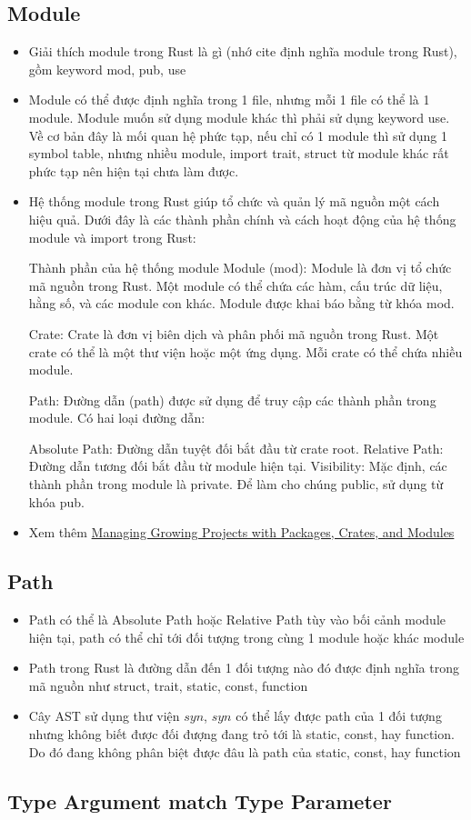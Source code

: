 \subsection{Module}

\begin{itemize}
    \item Giải thích module trong Rust là gì (nhớ cite định nghĩa module trong Rust), gồm keyword mod, pub, use
    \item Module có thể được định nghĩa trong 1 file, nhưng mỗi 1 file có thể là 1 module. Module muốn sử dụng module khác thì phải sử dụng keyword use. Về cơ bản đây là mối quan hệ phức tạp, nếu chỉ có 1 module thì sử dụng 1 symbol table, nhưng nhiều module, import trait, struct từ module khác rất phức tạp nên hiện tại chưa làm được.
    \item Hệ thống module trong Rust giúp tổ chức và quản lý mã nguồn một cách hiệu quả. Dưới đây là các thành phần chính và cách hoạt động của hệ thống module và import trong Rust:

    Thành phần của hệ thống module
    Module (mod): Module là đơn vị tổ chức mã nguồn trong Rust. Một module có thể chứa các hàm, cấu trúc dữ liệu, hằng số, và các module con khác. Module được khai báo bằng từ khóa mod.

    Crate: Crate là đơn vị biên dịch và phân phối mã nguồn trong Rust. Một crate có thể là một thư viện hoặc một ứng dụng. Mỗi crate có thể chứa nhiều module.

    Path: Đường dẫn (path) được sử dụng để truy cập các thành phần trong module. Có hai loại đường dẫn:

    Absolute Path: Đường dẫn tuyệt đối bắt đầu từ crate root.
    Relative Path: Đường dẫn tương đối bắt đầu từ module hiện tại.
    Visibility: Mặc định, các thành phần trong module là private. Để làm cho chúng public, sử dụng từ khóa pub.
    \item Xem thêm \href{https://doc.rust-lang.org/book/ch07-00-managing-growing-projects-with-packages-crates-and-modules.html}{Managing Growing Projects with Packages, Crates, and Modules}
\end{itemize}

\subsection{Path}

\begin{itemize}
    \item Path có thể là Absolute Path hoặc Relative Path tùy vào bối cảnh module hiện tại, path có thể chỉ tới đối tượng trong cùng 1 module hoặc khác module
    \item Path trong Rust là đường dẫn đến 1 đối tượng nào đó được định nghĩa trong mã nguồn như struct, trait, static, const, function
    \item Cây AST sử dụng thư viện $syn$, $syn$ có thể lấy được path của 1 đối tượng nhưng không biết được đối đượng đang trỏ tới là static, const, hay function. Do đó đang không phân biệt được đâu là path của static, const, hay function
\end{itemize}

\subsection{Type Argument match Type Parameter}
